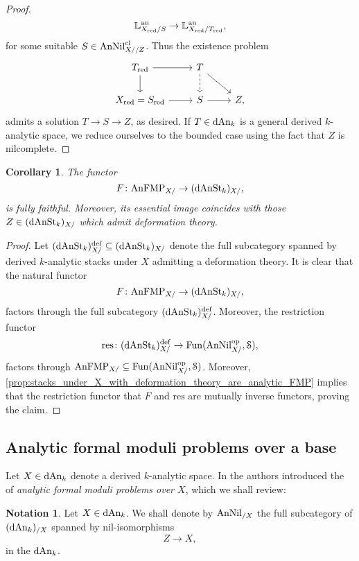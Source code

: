 \documentclass[10pt,a4paper,reqno]{amsart} %
\theoremstyle{plain}
\newtheorem{cor}[thm]{Corollary}
\theoremstyle{definition}
\newtheorem{notation}[thm]{Notation}
\theoremstyle{remark}
\numberwithin{equation}{section}
\begin{document}
\begin{proof}
        \[
            \mathbb L^\mathrm{an}_{X_{\mathrm{red}}/ S} \to \mathbb L^\mathrm{an}_{X_{\mathrm{red}}/ T_{\mathrm{red}}},  
        \]
    for some suitable $S \in \mathrm{AnNil}^{\mathrm{cl}}_{X/ /Z}$. Thus the existence problem
        \[
        \begin{tikzcd}
            T_\red \ar{r} \ar{d} & T \arrow[d, dashrightarrow] \ar{rd} & \\
            X_\red = S_\red \ar{r} & S  \ar{r} & Z,
        \end{tikzcd}
        \]
    admits a solution $T \to S \to Z$, as desired. If $T \in \mathrm{dAn}_k$ is a general derived $k$-analytic space, we reduce ourselves to the bounded case
    using the fact that $Z$ is nilcomplete.
\end{proof}


\begin{cor}
    The functor
        \[
            F \colon \mathrm{AnFMP}_{X/ } \to (\mathrm{dAnSt}_k)_{X/ },  
        \]
    is fully faithful. Moreover, its essential image coincides with those $Z \in (\mathrm{dAnSt}_k)_{X/ }$ which admit deformation theory.
\end{cor}

\begin{proof}
    Let $(\mathrm{dAnSt}_k)^{\mathrm{def}}_{X/ } \subseteq (\mathrm{dAnSt}_k)_{X/ }$ denote the full subcategory spanned by derived $k$-analytic stacks under $X$ admitting
    a deformation theory. It is clear that the natural functor
        \[
            F \colon \mathrm{AnFMP}_{X/ } \to (\mathrm{dAnSt}_k)_{X/ },  
        \]
    factors through the full subcategory $(\mathrm{dAnSt}_k)_{X/ }^\mathrm{def}$. Moreover, the restriction functor
        \[
            \mathrm{res} \colon (\mathrm{dAnSt}_k)_{X/ }^\mathrm{def} \to \operatorname{Fun}(\mathrm{AnNil}_{X/ }^\mathrm{op}, \mathcal S),  
        \]
    factors through $\mathrm{AnFMP}_{X/ } \subseteq \operatorname{Fun}(\mathrm{AnNil}_{X/ }^\mathrm{op}, \mathcal S)$. Moreover,
    \cref{prop:stacks_under_X_with_deformation_theory_are_analytic_FMP} implies that the restriction functor that $F$ and $\mathrm{res}$ are mutually inverse functors,
    proving the claim.
\end{proof}



\subsection{Analytic formal moduli problems over a base}
Let $X \in \mathrm{dAn}_k$ denote a derived $k$-analytic space. In \cite[Definition 6.11]{Porta_Yu_NQK}
the authors introduced the \infcat of \emph{analytic formal moduli problems over $X$}, which we shall review:

\begin{notation}
    Let $X \in \mathrm{dAn}_k$. We shall denote by $\mathrm{AnNil}_{/X}$ the full subcategory of $(\mathrm{dAn}_k)_{/X}$ spanned by nil-isomorphisms
        \[
            Z \to X,
        \]
    in the \infcat $\mathrm{dAn}_k$.
\end{notation}
\end{document}
